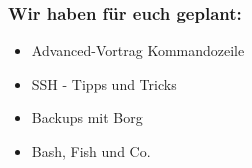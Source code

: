 \begin{frame}
\frametitle{Wir haben für euch geplant:}
\begin{itemize}
	\item Advanced-Vortrag Kommandozeile
	\item SSH - Tipps und Tricks
	\item Backups mit Borg
	\item Bash, Fish und Co.
\end{itemize}
\end{frame}

